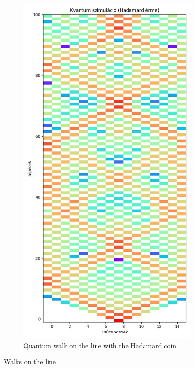 \begin{figure}[H]
\begin{subfigure}{.45\linewidth}
  \end{subfigure}
  \begin{subfigure}{.45\linewidth}
    \centering
    \includegraphics[width=\linewidth]{./figures/results/path/hadamard.jpg}
    \caption{Quantum walk on the line with the Hadamard coin}
  \end{subfigure}
  \caption{Walks on the line}
\end{figure}

